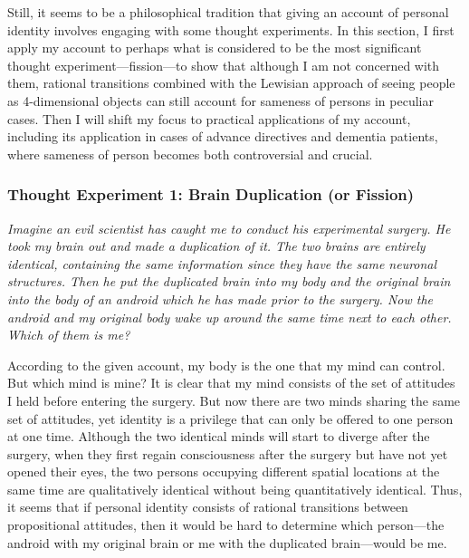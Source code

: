 Still, it seems to be a philosophical tradition that giving an account
of personal identity involves engaging with some thought experiments. In
this section, I first apply my account to perhaps what is
considered to be the most significant thought
experiment---fission---to show that although I am not concerned with
them, rational transitions combined with the Lewisian approach of seeing
people as 4-dimensional objects can still account for sameness of
persons in peculiar cases. Then I will shift my focus to practical
applications of my account, including its application in cases of
advance directives and dementia patients, where sameness of person
becomes both controversial and crucial.

\subsubsection*{Thought Experiment 1: Brain Duplication (or Fission)} \emph{Imagine an evil scientist has caught me to conduct his
experimental surgery. He took my brain out and made a duplication of it.
The two brains are entirely identical, containing the same information
since they have the same neuronal structures. Then he put the duplicated
brain into my body and the original brain into the body of an android
which he has made prior to the surgery. Now the android and my original
body wake up around the same time next to each other. Which of them is
me?}
\vspace{1em}

According to the given account, my body is the one that my mind can
control. But which mind is mine? It is clear that my mind consists of
the set of attitudes I held before entering the surgery. But now there
are two minds sharing the same set of attitudes, yet identity is a
privilege that can only be offered to one person at one time. Although
the two identical minds will start to diverge after the surgery, when
they first regain consciousness after the surgery but have not yet
opened their eyes, the two persons occupying different spatial locations
at the same time are qualitatively identical without being
quantitatively identical. Thus, it seems that if personal identity
consists of rational transitions between propositional attitudes, then
it would be hard to determine which person---the android with my
original brain or me with the duplicated brain---would be me.


